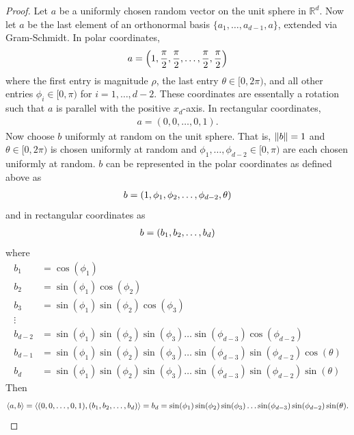 \documentclass{article} %
\theoremstyle{plain}
\def\Rl{\mathbb{R}}
\newcommand{\VEC}[2]{\left\langle #1, #2 \right\rangle}
\numberwithin{equation}{section} %
\numberwithin{figure}{section} %
\numberwithin{table}{section} %
\begin{document}
\begin{proof}
    Let $a$ be a uniformly chosen random vector on the unit sphere in $\Rl^d$.  Now let $a$ be the last element of an orthonormal basis $\{a_1, \dots, a_{d-1}, a\}$, extended via Gram-Schmidt.  In polar coordinates,
    \begin{align*}
        a = \qty(1, \frac{\pi}{2}, \frac{\pi}{2}, \dots, \frac{\pi}{2}, \frac{\pi}{2})
    \end{align*}
    where the first entry is magnitude $\rho$, the last entry $\theta \in [0, 2\pi)$, and all other entries $\phi_i \in [0, \pi)$ for $i = 1, \dots, d-2$.  These coordinates are essentally a rotation such that $a$ is parallel with the positive $x_d$-axis.  In rectangular coordinates,
    \begin{align*}
        a = (0, 0, \dots, 0, 1).
    \end{align*}
    Now choose $b$ uniformly at random on the unit sphere.  That is, $\norm{b} = 1$ and $\theta \in [0,2\pi)$ is chosen uniformly at random and $\phi_1, \dots, \phi_{d-2} \in [0, \pi)$ are each chosen uniformly at random.  $b$ can be represented in the polar coordinates as defined above as
    \begin{align*}
        b = \qty(1, \phi_1, \phi_2, \dots, \phi_{d-2}, \theta)
    \end{align*}
    and in rectangular coordinates as
    \begin{align*}
        b = \qty(b_1, b_2, \dots, b_d)
    \end{align*}
    where
    \begin{align*}
        b_1 &= \cos(\phi_1) \\
        b_2 &= \sin(\phi_1)\cos(\phi_2) \\
        b_3 &= \sin(\phi_1)\sin(\phi_2)\cos(\phi_3) \\
        \vdots\ \ & \\
        b_{d-2} &= \sin(\phi_1)\sin(\phi_2)\sin(\phi_3)\dots\sin(\phi_{d-3})\cos(\phi_{d-2})\\
        b_{d-1} &= \sin(\phi_1)\sin(\phi_2)\sin(\phi_3)\dots\sin(\phi_{d-3})\sin(\phi_{d-2})\cos(\theta) \\
        b_d &= \sin(\phi_1)\sin(\phi_2)\sin(\phi_3)\dots\sin(\phi_{d-3})\sin(\phi_{d-2})\sin(\theta)
    \end{align*}
    Then
    \begin{align*}
        \VEC{a}{b} = \VEC{(0, 0, \dots, 0, 1)}{\qty(b_1, b_2, \dots, b_d)} = b_d = \sin(\phi_1)\sin(\phi_2)\sin(\phi_3)\dots\sin(\phi_{d-3})\sin(\phi_{d-2})\sin(\theta).

\end{align*}
\end{proof}
\end{document}
